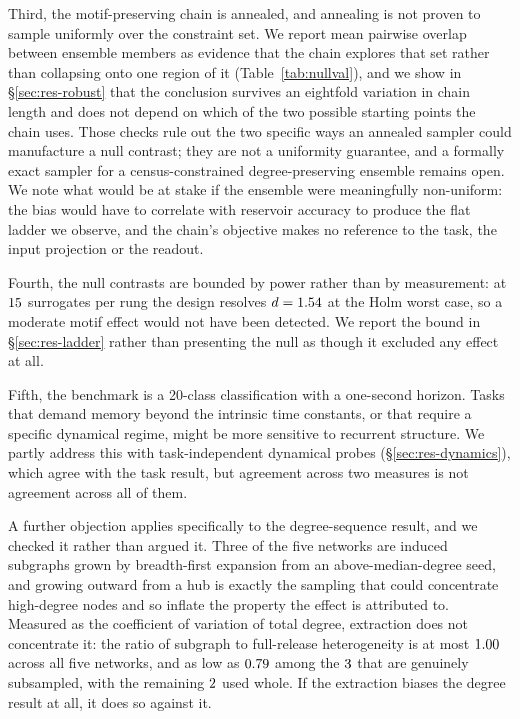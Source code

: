 Third, the motif-preserving chain is annealed, and annealing is not proven to sample
uniformly over the constraint set. We report mean pairwise overlap between ensemble
members as evidence that the chain explores that set rather than collapsing onto one
region of it (Table~\ref{tab:nullval}), and we show in \S\ref{sec:res-robust} that the
conclusion survives an eightfold variation in chain length and does not depend on which
of the two possible starting points the chain uses. Those checks rule out the two
specific ways an annealed sampler could manufacture a null contrast; they are not a
uniformity guarantee, and a formally exact sampler for a census-constrained
degree-preserving ensemble remains open. We note what would be at stake if the ensemble
were meaningfully non-uniform: the bias would have to correlate with reservoir accuracy
to produce the flat ladder we observe, and the chain's objective makes no reference to
the task, the input projection or the readout.

Fourth, the null contrasts are bounded by power rather than by measurement: at
$15$ surrogates per rung the design resolves $d = 1.54$ at the Holm
worst case, so a moderate motif effect would not have been detected. We report the bound
in \S\ref{sec:res-ladder} rather than presenting the null as though it excluded any
effect at all.

Fifth, the benchmark is a 20-class classification with a one-second horizon. Tasks that
demand memory beyond the intrinsic time constants, or that require a specific dynamical
regime, might be more sensitive to recurrent structure. We partly address this with
task-independent dynamical probes (\S\ref{sec:res-dynamics}), which agree with the task
result, but agreement across two measures is not agreement across all of them.

A further objection applies specifically to the degree-sequence result, and we checked
it rather than argued it. Three of the five networks are induced subgraphs grown by
breadth-first expansion from an above-median-degree seed, and growing outward from a hub
is exactly the sampling that could concentrate high-degree nodes and so inflate the
property the effect is attributed to. Measured as the coefficient of variation of total
degree, extraction does not concentrate it: the ratio of subgraph to full-release
heterogeneity is at most $1.00$ across all five networks, and as low as
$0.79$ among the $3$ that are genuinely subsampled, with the
remaining $2$ used whole. If the extraction biases the degree result at
all, it does so against it.


